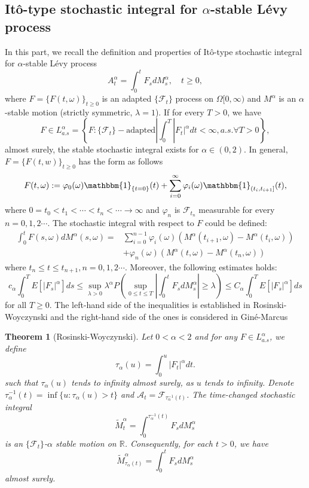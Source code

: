 \documentclass[11pt]{amsart}
\theoremstyle{plain}
\newtheorem{theorem}{Theorem}[section]
\numberwithin{equation}{section}
\begin{document}
\subsection{It\^{o}-type stochastic integral for $\alpha$-stable L\'{e}vy process}
In this part, we recall the definition and properties of It\^{o}-type stochastic integral for $\alpha$-stable L\'{e}vy process\cite{Protter}
$$
A_t^\alpha = \int_0^t F_s dM_s^\alpha, \quad t\geq 0,
$$
where $F=\{F(t,\omega)\}_{t\geq 0}$ is an adapted $\{\mathscr{F}_t\}$ process on $\Omega[0,\infty)$ and $M^\alpha$ is an $\alpha$-stable motion (strictly symmetric, $\lambda=1$). If for every $T>0$, we have 
$$
F\in L^\alpha_{a.s} = \left\{F: \{\mathscr{F}_t\}-\text{adapted}|\int_0^T|F_t|^\alpha dt<\infty,a.s.\forall T>0 \right\},
$$
almost surely, the stable stochastic integral exists for $\alpha \in (0,2)$. In general, $F=\{F(t,w)\}_{t\geq 0}$ has the form as follows
$$
F(t,\omega):=\varphi_0(\omega)\mathbbm{1}_{\{t=0\}}(t)+\sum_{i=0}^\infty\varphi_i(\omega)\mathbbm{1}_{(t_i,t_{i+1}]}(t),
$$
where $0=t_0<t_1<\cdots<t_n<\cdots\rightarrow\infty$ and $\varphi_n$ is $\mathscr{F}_{t_n}$ measurable for every $n=0,1,2\cdots$. The stochastic integral with respect to $F$ could be defined:
\begin{equation*}
\begin{aligned}
\int_0^tF(s,\omega)dM^\alpha(s,\omega)=&\sum_{i=0}^{n-1}\varphi_i(\omega)(M^\alpha(t_{i+1},\omega)-M^\alpha(t_i,\omega))\\
&+\varphi_n(\omega)(M^\alpha(t,\omega)-M^\alpha(t_n,\omega))
\end{aligned}
\end{equation*}
where $t_n\leq t\leq t_{n+1},n=0,1,2\cdots$. Moreover, the following estimates holds:
\begin{equation}\label{sec2-eq1}
c_\alpha\int_0^T E[|F_s|^\alpha]ds\leq\sup_{\lambda>0}\lambda^\alpha P\left(\sup_{0\leq t \leq T} \left|\int_0^t F_sdM_s^\alpha\right|\geq \lambda\right)\leq C_\alpha\int_0^T E[|F_s|^\alpha]ds
\end{equation}
for all $T\geq 0$. The left-hand side of the inequalities is established in Rosinski-Woyczynski\cite{Rosinski} and the right-hand side of the ones is considered in Gin\'{e}-Marcus\cite{Gine}

\begin{theorem}[Rosinski-Woyczynski\cite{Rosinski}]
Let $0<\alpha<2$ and for any $F\in L^\alpha_{a.s}$, we define
$$
\tau_\alpha(u) =\int_0^u |F_t|^\alpha dt.
$$
such that $\tau_\alpha(u)$ tends to infinity almost surely, as $u$ tends to infinity. Denote $\tau_\alpha^{-1}(t)=\inf\{u:\tau_\alpha(u)>t\}$ and $\mathscr{A}_t=\mathscr{F}_{\tau_\alpha^{-1}(t)}$. The time-changed stochastic integral
$$
\widetilde{M}_t^\alpha=\int_0^{\tau_\alpha^{-1}(t)}F_sdM_s^\alpha
$$
is an $\{\mathscr{F}_t\}$-$\alpha$ stable motion on $\mathbb{R}$. Consequently, for each $t>0$, we have 
$$
\widetilde{M}^\alpha_{\tau_\alpha(t)}=\int_0^tF_sdM_s^\alpha
$$
almost surely. 
\end{theorem}
\end{document}
